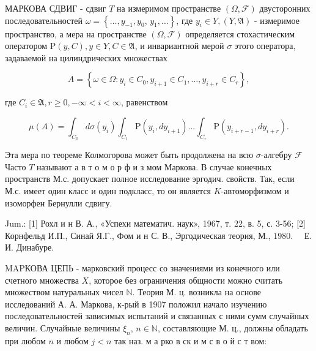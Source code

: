 \documentclass[10pt]{article}
\begin{document}
МАРКОВА СДВИГ - сдвиг $T$ на измеримом пространстве $(\Omega, \mathscr{F})$ двусторонних последовательностей $\omega=\left\{\ldots, y_{-1}, y_{0}\right.$, $\left.y_{1}, \ldots\right\}$, где $y_{i} \in Y,(Y, \mathfrak{A})$ - измеримое пространство, а мера на пространстве $(\Omega, \mathscr{F})$ определяется стохастическим оператором $\mathrm{P}(y, C), y \in Y, C \in \mathfrak{A}$, и инвариантной мерой $\sigma$ этого оператора, задаваемой на цилиндрических множествах



\[

A=\left\{\omega \in \Omega: y_{i} \in C_{0}, y_{i+1} \in C_{1}, \ldots, y_{i+r} \in C_{r}\right\},

\]



где $C_{i} \in \mathfrak{A}, r \geqslant 0,-\infty<i<\infty$, равенством



\[

\mu(A)=\int_{C_{0}} d \sigma\left(y_{i}\right) \int_{C_{1}} \mathrm{P}\left(y_{i}, d y_{i+1}\right) \ldots \int_{C_{r}} \mathrm{P}\left(y_{i+r-1}, d y_{i+r}\right) .

\]



Эта мера по теореме Колмогорова может быть продолжена на всю $\sigma$-алгебру $\mathscr{F}$ Часто $T$ называют а в т о м о р ф и з мом Маркова. В случае конечных пространств М.с. допускает полное исследование эргодич. свойств. Так, если М.с. имеет один класс и один подкласс, то он является $K$-автоморфизмом и изоморфен Бернулли сдвигу.



Jum.: [1] Рохл и н В. А., «Успехи математич. наук», 1967, т. 22, в. 5, с. 3-56; [2] Корнфельд И.П., Синай Я.Г., Фом и н С. В., Эргодическая теория, М., $1980 . \quad$ Е. И. Динабуре.



MAPКОВА ЦЕПЬ - марковский процесс со значениями из конечного или счетного множества $X$, которое без ограничения общности можно считать множеством натуральных чисел $\mathbb{N}$. Теория М. ц. возникла на основе исследований А. А. Маркова, к-рый в 1907 положил начало изучению последовательностей зависимых испытаний и связанных с ними сумм случайных величин. Случайные величины $\xi_{n}$, $n \in \mathbb{N}$, составляющие М. ц., должны обладать при любом $n$ и любом $j<n$ так наз. м а рко в ск и м с в о й с т вом:
\end{document}
